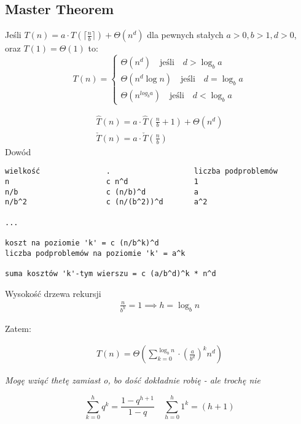 \documentclass{article}
\numberwithin{equation}{subsection}
\newenvironment{theorem}[1]{%
    \trivlist
    \item[\hskip\labelsep\textbf{Theorem. #1.}]
    \ignorespaces
}{%
    \endtrivlist
}
\begin{document}
\subsection{Master Theorem}

\begin{theorem}{Master Theorem}
    Jeśli $T(n) = a\cdot T(\lceil \frac{n}{b} \rceil) + \Theta(n^d)$ dla pewnych stałych $a>0, b>1, d>0$, oraz $T(1)=\Theta(1)$ to:
    \[
    T(n) = \begin{cases}
        \Theta\left(n^d\right) \quad \text{jeśli} \quad d > \log_b a\\
        \Theta\left(n^d \log n\right) \quad \text{jeśli} \quad d = \log_b a\\
        \Theta\left(n^{log_b a}\right) \quad \text{jeśli} \quad d < \log_b a
    \end{cases}
    \]
\end{theorem}

\begin{align}
\hat{T} (n) = a\cdot \hat{T} \left(\frac{n}{b} + 1 \right) + \Theta(n^d)\\
\check{T} (n) = a\cdot \check{T} \left(\frac{n}{b} \right)
\end{align}
Dowód
\begin{verbatim}
wielkość               .                   liczba podproblemów    
n                      c n^d               1                       
n/b                    c (n/b)^d           a
n/b^2                  c (n/(b^2))^d       a^2

...

koszt na poziomie 'k' = c (n/b^k)^d
liczba podproblemów na poziomie 'k' = a^k

suma kosztów 'k'-tym wierszu = c (a/b^d)^k * n^d
\end{verbatim}

Wysokość drzewa rekursji
\begin{align}
    \frac{n}{b^h} = 1 \implies h = \log_b n
\end{align}

Zatem:

\begin{align}
    T(n) = \Theta\left(\sum_{k=0}^{\log_b n} \cdot \left(\frac{a}{b^d}\right)^k n^d \right)
\end{align}

\textit{Mogę wziąć thetę zamiast o, bo dość dokładnie robię - ale trochę nie}

\[
    \sum_{k=0}^{h} q^k = \frac{1-q^{h+1}}{1-q} \quad \sum_{h=0}^{h} 1^k = (h+1)
\]
\end{document}
